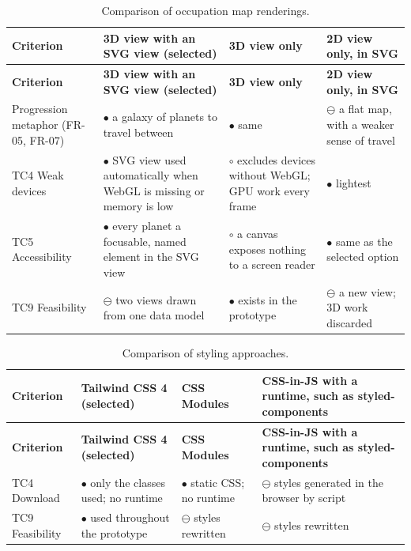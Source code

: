 {\small
\begin{longtable}{|>{\raggedright\arraybackslash}p{}|>{\raggedright\arraybackslash}p{}|>{\raggedright\arraybackslash}p{}|>{\raggedright\arraybackslash}p{}|}
\caption{Comparison of occupation map renderings.} \\
\hline
\textbf{Criterion} & \textbf{3D view with an SVG view (selected)} & \textbf{3D view only} & \textbf{2D view only, in SVG} \\ \hline
\endfirsthead
\hline
\textbf{Criterion} & \textbf{3D view with an SVG view (selected)} & \textbf{3D view only} & \textbf{2D view only, in SVG} \\ \hline
\endhead
Progression metaphor (FR-05, FR-07) & $\bullet$ a galaxy of planets to travel between & $\bullet$ same & $\ominus$ a flat map, with a weaker sense of travel \\ \hline
TC4 Weak devices & $\bullet$ SVG view used automatically when WebGL is missing or memory is low & $\circ$ excludes devices without WebGL; GPU work every frame\cite{r139} & $\bullet$ lightest \\ \hline
TC5 Accessibility & $\bullet$ every planet a focusable, named element in the SVG view\cite{r140} & $\circ$ a canvas exposes nothing to a screen reader & $\bullet$ same as the selected option \\ \hline
TC9 Feasibility & $\ominus$ two views drawn from one data model & $\bullet$ exists in the prototype & $\ominus$ a new view; 3D work discarded \\ \hline
\end{longtable}
}

{\small
\begin{longtable}{|>{\raggedright\arraybackslash}p{}|>{\raggedright\arraybackslash}p{}|>{\raggedright\arraybackslash}p{}|>{\raggedright\arraybackslash}p{}|}
\caption{Comparison of styling approaches.} \\
\hline
\textbf{Criterion} & \textbf{Tailwind CSS 4 (selected)} & \textbf{CSS Modules\cite{r172}} & \textbf{CSS-in-JS with a runtime, such as styled-\allowbreak{}components\cite{r173}} \\ \hline
\endfirsthead
\hline
\textbf{Criterion} & \textbf{Tailwind CSS 4 (selected)} & \textbf{CSS Modules\cite{r172}} & \textbf{CSS-in-JS with a runtime, such as styled-\allowbreak{}components\cite{r173}} \\ \hline
\endhead
TC4 Download & $\bullet$ only the classes used; no runtime\cite{r141} & $\bullet$ static CSS; no runtime & $\ominus$ styles generated in the browser by script \\ \hline
TC9 Feasibility & $\bullet$ used throughout the prototype & $\ominus$ styles rewritten & $\ominus$ styles rewritten \\ \hline
\end{longtable}
}

